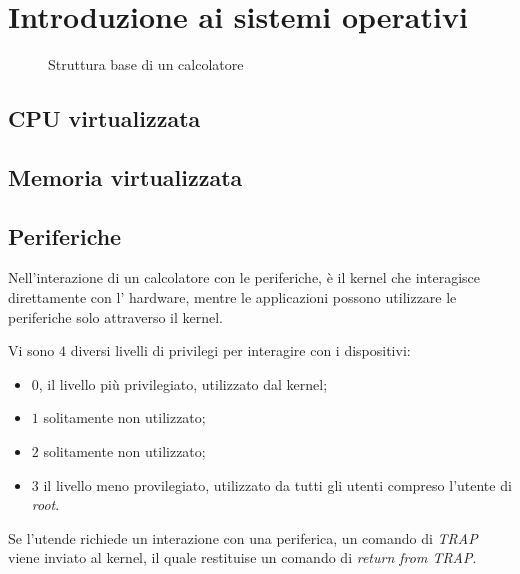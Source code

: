 \chapter{Introduzione ai sistemi operativi}
\begin{figure}[ht]
    \centering
    \caption{Struttura base di un calcolatore}
    \label{fig:struttura}
\end{figure}

\section{CPU virtualizzata}

\section{Memoria virtualizzata}


\section{Periferiche}
Nell'interazione di un calcolatore con le periferiche, è il kernel che
interagisce direttamente con l' hardware, mentre le applicazioni possono
utilizzare le periferiche solo attraverso il kernel.


Vi sono $4$ diversi livelli di privilegi per interagire con i dispositivi:
\begin{itemize}
  \item $0$, il livello più privilegiato, utilizzato dal kernel;
  \item $1$ solitamente non utilizzato;
  \item $2$ solitamente non utilizzato;
  \item $3$ il livello meno provilegiato, utilizzato da tutti gli utenti
    compreso l'utente di \emph{root}.
\end{itemize}

Se l'utende richiede un interazione con una periferica, un comando di
\emph{TRAP} viene inviato al kernel, il quale restituise un comando di
\emph{return from TRAP}.

